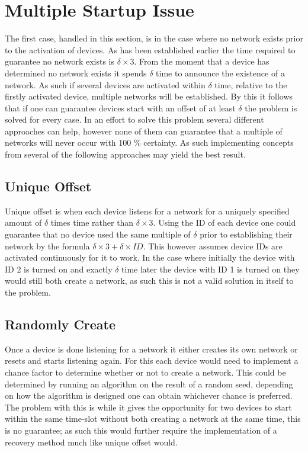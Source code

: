 \section{Multiple Startup Issue}\label{sec:MSI-CCRC}
The first case, handled in this section, is in the case where no network exists prior to the activation of devices.
As has been established earlier the time required to guarantee no network exists is $\delta \times 3$.
From the moment that a device has determined no network exists it spends $\delta$ time to announce the existence of a network.
As such if several devices are activated within $\delta$ time, relative to the firstly activated device, multiple networks will be established.
By this it follows that if one can guarantee devices start with an offset of at least $\delta$ the problem is solved for every case.
In an effort to solve this problem several different approaches can help, however none of them can guarantee that a multiple of networks will never occur with 100 \% certainty. 
As such implementing concepts from several of the following approaches may yield the best result.

\subsection{Unique Offset}
Unique offset is when each device listens for a network for a uniquely specified amount of $\delta$ times time rather than $\delta \times 3$.
Using the ID of each device one could guarantee that no device used the same multiple of $\delta$ prior to establishing their network by the formula $\delta \times 3 + \delta \times ID$.
This however assumes device IDs are activated continuously for it to work.
In the case where initially the device with ID 2 is turned on and exactly $\delta$ time later the device with ID 1 is turned on they would still both create a network, as such this is not a valid solution in itself to the problem.

\subsection{Randomly Create}\label{RCreate}
Once a device is done listening for a network it either creates its own network or resets and starts listening again.
For this each device would need to implement a chance factor to determine whether or not to create a network.
This could be determined by running an algorithm on the result of a random seed, depending on how the algorithm is designed one can obtain whichever chance is preferred.
The problem with this is while it gives the opportunity for two devices to start within the same time-slot without both creating a network at the same time, this is no guarantee; as such this would further require the implementation of a recovery method much like unique offset would.

